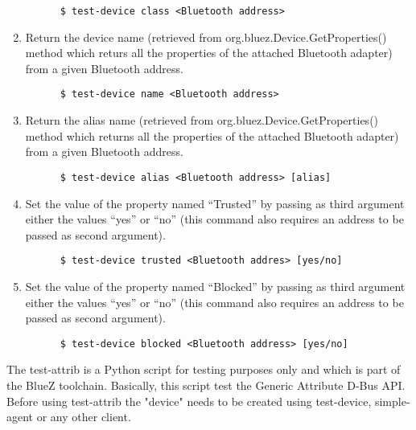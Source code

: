\documentclass[11pt]{article}
\begin{document}
\begin{enumerate}
    \begin{verbatim}
      $ test-device class <Bluetooth address>
    \end{verbatim}
  \item Return the device name (retrieved from
        org.bluez.Device.GetProperties() method which returs all the
        properties of the attached Bluetooth adapter) from a given
        Bluetooth address.
    \begin{verbatim}
      $ test-device name <Bluetooth address>
    \end{verbatim}
  \item Return the alias name (retrieved from
        org.bluez.Device.GetProperties() method which returns all the
        properties of the attached Bluetooth adapter) from a given
        Bluetooth address.
    \begin{verbatim}
      $ test-device alias <Bluetooth address> [alias]
    \end{verbatim}
  \item Set the value of the property named ``Trusted'' by passing as
        third argument either the values ``yes'' or ``no''
        (this command also requires an address to be passed as second
         argument).
    \begin{verbatim}
      $ test-device trusted <Bluetooth addres> [yes/no]
    \end{verbatim}
  \item Set the value of the property named ``Blocked'' by passing as
        third argument either the values ``yes'' or ``no''
        (this command also requires an address to be passed as second
         argument).
    \begin{verbatim}
      $ test-device blocked <Bluetooth address> [yes/no]
    \end{verbatim}
\end{enumerate}

The test-attrib is a Python script for testing purposes only and which is part
of the BlueZ toolchain. Basically, this script test the Generic Attribute
D-Bus API. Before using test-attrib the "device" needs to be created using
test-device, simple-agent or any other client.
\end{document}
